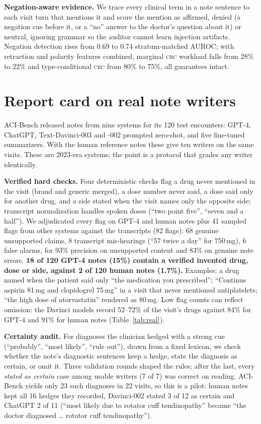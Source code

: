 \documentclass[10pt,twocolumn]{article}
\newcommand{\crc}{\textsc{crc}}
\begin{document}
\textbf{Negation-aware evidence.} We trace every clinical term in a note sentence to each visit turn that mentions it and score the mention as affirmed, denied (a negation cue before it, or a ``no'' answer to the doctor's question about it) or neutral, ignoring grammar so the auditor cannot learn injection artifacts. Negation detection rises from 0.69 to 0.74 stratum-matched AUROC; with retraction and polarity features combined, marginal \crc{} workload falls from 28\% to 22\% and type-conditional \crc{} from 80\% to 75\%, all guarantees intact.

\section{Report card on real note writers}\label{sec:real}
ACI-Bench released notes from nine systems for its 120 test encounters: GPT-4, ChatGPT, Text-Davinci-003 and -002 prompted zero-shot, and five fine-tuned summarizers. With the human reference notes these give ten writers on the same visits. These are 2023-era systems; the point is a protocol that grades any writer identically.

\textbf{Verified hard checks.} Four deterministic checks flag a drug never mentioned in the visit (brand and generic merged), a dose number never said, a dose said only for another drug, and a side stated when the visit names only the opposite side; transcript normalization handles spoken doses (``two point five'', ``seven and a half''). We adjudicated every flag on GPT-4 and human notes plus 41 sampled flags from other systems against the transcripts (82 flags): 68 genuine unsupported claims, 8 transcript mis-hearings (``57 twice a day'' for 750\,mg), 6 false alarms, for 93\% precision on unsupported content and 83\% on genuine note errors. \textbf{18 of 120 GPT-4 notes (15\%) contain a verified invented drug, dose or side, against 2 of 120 human notes (1.7\%).} Examples: a drug named when the patient said only ``the medication you prescribed''; ``Continue aspirin 81\,mg and clopidogrel 75\,mg'' in a visit that never mentioned antiplatelets; ``the high dose of atorvastatin'' rendered as 80\,mg. Low flag counts can reflect omission: the Davinci models record 52--72\% of the visit's drugs against 84\% for GPT-4 and 91\% for human notes (Table~\ref{tab:real}).

\textbf{Certainty audit.} For diagnoses the clinician hedged with a strong cue (``probably'', ``most likely'', ``rule out''), drawn from a fixed lexicon, we check whether the note's diagnostic sentences keep a hedge, state the diagnosis as certain, or omit it. Three validation rounds shaped the rules; after the last, every \emph{stated as certain} case among usable writers (7 of 7) was correct on reading. ACI-Bench yields only 23 such diagnoses in 22 visits, so this is a pilot: human notes kept all 16 hedges they recorded, Davinci-002 stated 3 of 12 as certain and ChatGPT 2 of 11 (``most likely due to rotator cuff tendinopathy'' became ``the doctor diagnosed \ldots{} rotator cuff tendinopathy'').
\end{document}
